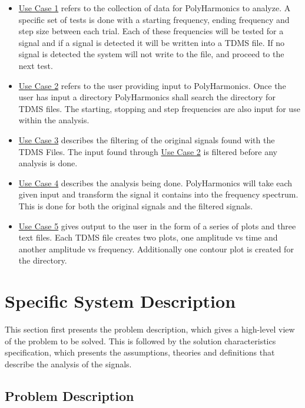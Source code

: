 \documentclass[12pt]{article}
\newcommand{\progname}{PolyHarmonics}
\begin{document}
\begin{itemize}
\item \hyperref[UC_RecordSig]{Use Case 1} refers to the collection of data for
  \progname{} to analyze. A specific set of tests is done with a starting
  frequency, ending frequency and step size between each trial. Each of these
  frequencies will be tested for a signal and if a signal is detected it will  
  be written into a TDMS file. If no signal is detected the system will  
  not write to the file, and proceed to the next test.  
\item \hyperref[UC_InputFile]{Use Case 2}
 refers to the user providing input
 to \progname{}. Once the user has input a directory 
\progname{} shall search the directory for TDMS files. The starting, stopping
and step frequencies are also input for use within the analysis.

\item \hyperref[UC_Filter]{Use Case 3} describes the filtering of the original
 signals found with the TDMS Files. The input found through
 \hyperref[UC_InputFile]{Use Case 2} is filtered before any analysis is done.

\item \hyperref[UC_AnalyzeInput]{Use Case 4} describes the analysis being
  done. \progname{} will take each given input and transform the signal it
  contains into the frequency spectrum. This is done for both the original
  signals and the filtered signals.

\item \hyperref[UC_PlotTrans]{Use Case 5} gives output to the user in the form
  of a series of plots and three text files. Each TDMS file creates two plots, 
one amplitude vs time and another amplitude vs frequency. Additionally 
one contour plot is created for the directory.
\end{itemize}

\section{Specific System Description}

This section first presents the problem description, which gives a high-level
view of the problem to be solved.  This is followed by the solution
characteristics specification, which presents the assumptions, theories and
definitions that describe the analysis of the signals.

\subsection{Problem Description} \label{Sec_pd}
\end{document}
